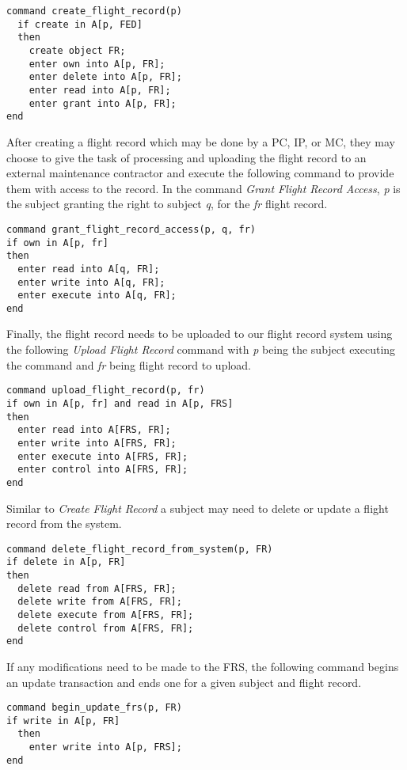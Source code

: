 \documentclass[10pt,journal,compsoc]{IEEEtran}
\begin{document}
\begin{lstlisting}
command create_flight_record(p)
  if create in A[p, FED]
  then
    create object FR;
    enter own into A[p, FR];
    enter delete into A[p, FR];
    enter read into A[p, FR];
    enter grant into A[p, FR];
end
\end{lstlisting}

After creating a flight record which may be done by a PC, IP, or MC, they may choose to give the task of processing and uploading the flight record to an external maintenance contractor and execute the following command to provide them with access to the record. 
In the command \textit{Grant Flight Record Access}, \textit{p} is the subject granting the right to subject \textit{q}, for the \textit{fr} flight record.

\begin{lstlisting}
command grant_flight_record_access(p, q, fr)
if own in A[p, fr]
then
  enter read into A[q, FR];
  enter write into A[q, FR];
  enter execute into A[q, FR];
end
\end{lstlisting}  

Finally, the flight record needs to be uploaded to our flight record system using the following \textit{Upload Flight Record} command with \textit{p} being the subject executing the command and \textit{fr} being flight record to upload.

\begin{lstlisting}
command upload_flight_record(p, fr)
if own in A[p, fr] and read in A[p, FRS]
then
  enter read into A[FRS, FR];
  enter write into A[FRS, FR];
  enter execute into A[FRS, FR];
  enter control into A[FRS, FR];
end
\end{lstlisting}

Similar to \textit{Create Flight Record} a subject may need to delete or update a flight record from the system. 

\begin{lstlisting}
command delete_flight_record_from_system(p, FR)
if delete in A[p, FR]
then
  delete read from A[FRS, FR];
  delete write from A[FRS, FR];
  delete execute from A[FRS, FR];
  delete control from A[FRS, FR];
end
\end{lstlisting}

If any modifications need to be made to the FRS, the following command begins an update transaction and ends one for a given subject and flight record. 

\begin{lstlisting}
command begin_update_frs(p, FR)
if write in A[p, FR]
  then
    enter write into A[p, FRS];
end
\end{lstlisting}
\end{document}
